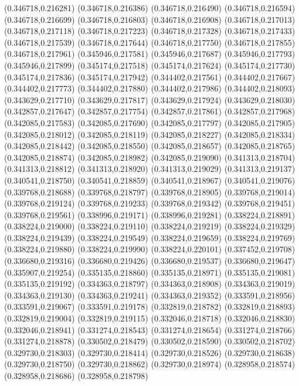 (0.346718,0.216281)
(0.346718,0.216386)
(0.346718,0.216490)
(0.346718,0.216594)
(0.346718,0.216699)
(0.346718,0.216803)
(0.346718,0.216908)
(0.346718,0.217013)
(0.346718,0.217118)
(0.346718,0.217223)
(0.346718,0.217328)
(0.346718,0.217433)
(0.346718,0.217539)
(0.346718,0.217644)
(0.346718,0.217750)
(0.346718,0.217855)
(0.346718,0.217961)
(0.345946,0.217581)
(0.345946,0.217687)
(0.345946,0.217793)
(0.345946,0.217899)
(0.345174,0.217518)
(0.345174,0.217624)
(0.345174,0.217730)
(0.345174,0.217836)
(0.345174,0.217942)
(0.344402,0.217561)
(0.344402,0.217667)
(0.344402,0.217773)
(0.344402,0.217880)
(0.344402,0.217986)
(0.344402,0.218093)
(0.343629,0.217710)
(0.343629,0.217817)
(0.343629,0.217924)
(0.343629,0.218030)
(0.342857,0.217647)
(0.342857,0.217754)
(0.342857,0.217861)
(0.342857,0.217968)
(0.342085,0.217583)
(0.342085,0.217690)
(0.342085,0.217797)
(0.342085,0.217905)
(0.342085,0.218012)
(0.342085,0.218119)
(0.342085,0.218227)
(0.342085,0.218334)
(0.342085,0.218442)
(0.342085,0.218550)
(0.342085,0.218657)
(0.342085,0.218765)
(0.342085,0.218874)
(0.342085,0.218982)
(0.342085,0.219090)
(0.341313,0.218704)
(0.341313,0.218812)
(0.341313,0.218920)
(0.341313,0.219029)
(0.341313,0.219137)
(0.340541,0.218750)
(0.340541,0.218859)
(0.340541,0.218967)
(0.340541,0.219076)
(0.339768,0.218688)
(0.339768,0.218797)
(0.339768,0.218905)
(0.339768,0.219014)
(0.339768,0.219124)
(0.339768,0.219233)
(0.339768,0.219342)
(0.339768,0.219451)
(0.339768,0.219561)
(0.338996,0.219171)
(0.338996,0.219281)
(0.338224,0.218891)
(0.338224,0.219000)
(0.338224,0.219110)
(0.338224,0.219219)
(0.338224,0.219329)
(0.338224,0.219439)
(0.338224,0.219549)
(0.338224,0.219659)
(0.338224,0.219769)
(0.338224,0.219880)
(0.338224,0.219990)
(0.338224,0.220101)
(0.337452,0.219708)
(0.336680,0.219316)
(0.336680,0.219426)
(0.336680,0.219537)
(0.336680,0.219647)
(0.335907,0.219254)
(0.335135,0.218860)
(0.335135,0.218971)
(0.335135,0.219081)
(0.335135,0.219192)
(0.334363,0.218797)
(0.334363,0.218908)
(0.334363,0.219019)
(0.334363,0.219130)
(0.334363,0.219241)
(0.334363,0.219352)
(0.333591,0.218956)
(0.333591,0.219067)
(0.333591,0.219178)
(0.332819,0.218782)
(0.332819,0.218893)
(0.332819,0.219004)
(0.332819,0.219115)
(0.332046,0.218718)
(0.332046,0.218830)
(0.332046,0.218941)
(0.331274,0.218543)
(0.331274,0.218654)
(0.331274,0.218766)
(0.331274,0.218878)
(0.330502,0.218479)
(0.330502,0.218590)
(0.330502,0.218702)
(0.329730,0.218303)
(0.329730,0.218414)
(0.329730,0.218526)
(0.329730,0.218638)
(0.329730,0.218750)
(0.329730,0.218862)
(0.329730,0.218974)
(0.328958,0.218574)
(0.328958,0.218686)
(0.328958,0.218798)

